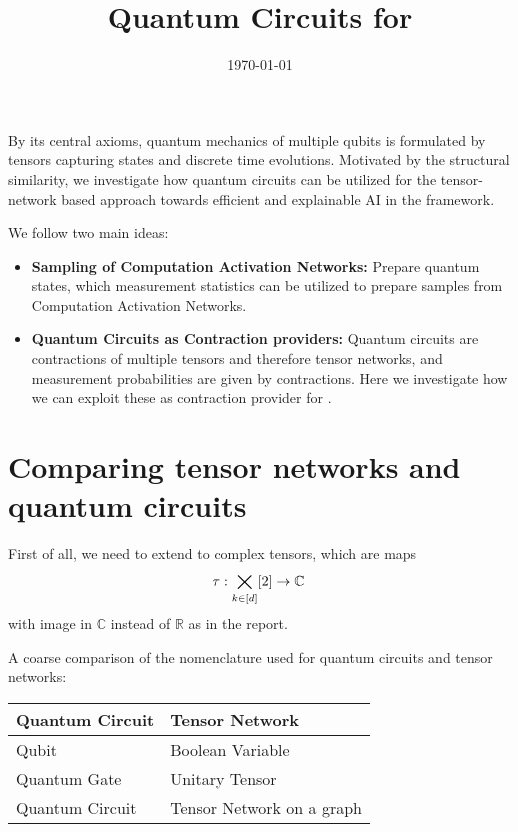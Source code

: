 \documentclass[aps,onecolumn,nofootinbib,pra]{article}
\begin{document}
    \title{Quantum Circuits for \tnreason}

    \maketitle
    \date{\today}

    By its central axioms, quantum mechanics of multiple qubits is formulated by tensors capturing states and discrete time evolutions.
    Motivated by the structural similarity, we investigate how quantum circuits can be utilized for the tensor-network based approach towards efficient and explainable AI in the \tnreason framework.

    We follow two main ideas:
    \begin{itemize}
        \item \textbf{Sampling of Computation Activation Networks:} Prepare quantum states, which measurement statistics can be utilized to prepare samples from Computation Activation Networks.
        \item \textbf{Quantum Circuits as Contraction providers:} Quantum circuits are contractions of multiple tensors and therefore tensor networks, and measurement probabilities are given by contractions.
    Here we investigate how we can exploit these as contraction provider for \tnreason.
    \end{itemize}




    \section{Comparing tensor networks and quantum circuits}

    First of all, we need to extend to complex tensors, which are maps
    \begin{align*}
        \tau : \bigtimes_{k\in[d]}[2] \rightarrow \mathbb{C} \,
    \end{align*}
    with image in $\mathbb{C}$ instead of $\mathbb{R}$ as in the report.

    A coarse comparison of the nomenclature used for quantum circuits and tensor networks:

    \begin{center}
        \begin{tabular}{l|l}
            \textbf{Quantum Circuit} & \textbf{Tensor Network}   \\
            \hline
            Qubit                    & Boolean Variable          \\
            Quantum Gate             & Unitary Tensor            \\
            Quantum Circuit          & Tensor Network on a graph
        \end{tabular}
    \end{center}
\end{document}
